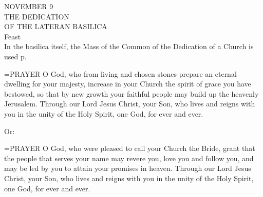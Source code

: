 \begin{center}\normalsize NOVEMBER 9\\
\footnotesize THE DEDICATION\\
\footnotesize OF THE LATERAN BASILICA\\
\footnotesize Feast\\
\footnotesize In the basilica itself, the Mass of the Common of the Dedication of a Church is used p.\\
\end{center}

\hangindent=\parindent \small{PRAYER 
O God, who from living and chosen stones
prepare an eternal dwelling for your majesty,
increase in your Church the spirit of grace you have bestowed,
so that by new growth your faithful people
may build up the heavenly Jerusalem.
Through our Lord Jesus Christ, your Son,
who lives and reigns with you in the unity of the Holy Spirit,
one God, for ever and ever.\\}
 
Or:

\hangindent=\parindent \small{PRAYER 
O God, who were pleased to call your Church the Bride,
grant that the people that serves your name
may revere you, love you and follow you,
and may be led by you
to attain your promises in heaven.
Through our Lord Jesus Christ, your Son,
who lives and reigns with you in the unity of the Holy Spirit,
one God, for ever and ever.\\}
 
